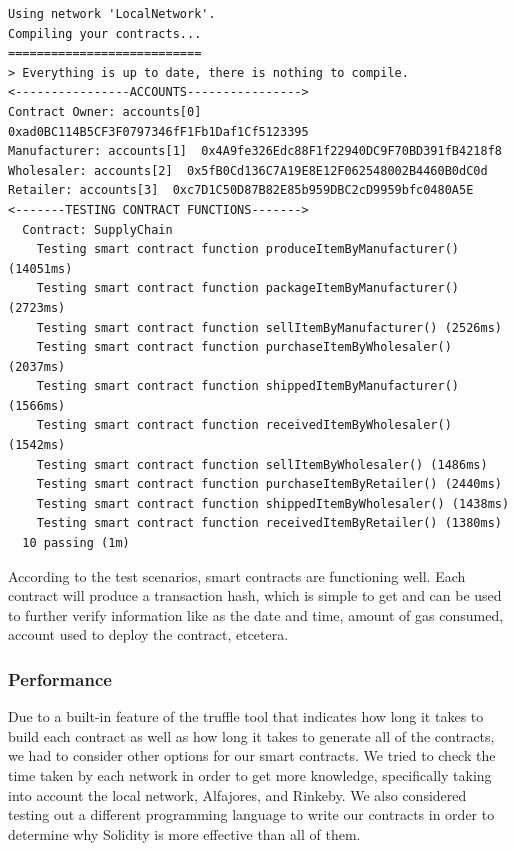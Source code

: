 \begin{lstlisting}[numbers=none, basicstyle=\ttfamily\tiny]
Using network 'LocalNetwork'.
Compiling your contracts...
===========================
> Everything is up to date, there is nothing to compile.
<----------------ACCOUNTS---------------->
Contract Owner: accounts[0]  0xad0BC114B5CF3F0797346fF1Fb1Daf1Cf5123395
Manufacturer: accounts[1]  0x4A9fe326Edc88F1f22940DC9F70BD391fB4218f8
Wholesaler: accounts[2]  0x5fB0Cd136C7A19E8E12F062548002B4460B0dC0d
Retailer: accounts[3]  0xc7D1C50D87B82E85b959DBC2cD9959bfc0480A5E
<-------TESTING CONTRACT FUNCTIONS------->
  Contract: SupplyChain
    Testing smart contract function produceItemByManufacturer() (14051ms)
    Testing smart contract function packageItemByManufacturer() (2723ms)
    Testing smart contract function sellItemByManufacturer() (2526ms)
    Testing smart contract function purchaseItemByWholesaler() (2037ms)
    Testing smart contract function shippedItemByManufacturer() (1566ms)
    Testing smart contract function receivedItemByWholesaler() (1542ms)
    Testing smart contract function sellItemByWholesaler() (1486ms)
    Testing smart contract function purchaseItemByRetailer() (2440ms)
    Testing smart contract function shippedItemByWholesaler() (1438ms)
    Testing smart contract function receivedItemByRetailer() (1380ms)
  10 passing (1m)
\end{lstlisting}

\vspace{.5cm}

According to the test scenarios, smart contracts are functioning well. Each contract will produce a transaction hash, which is simple to get and can be used to further verify information like as the date and time, amount of gas consumed, account used to deploy the contract, etcetera.

\subsubsection{Performance}

Due to a built-in feature of the truffle tool that indicates how long it takes to build each contract as well as how long it takes to generate all of the contracts, we had to consider other options for our smart contracts. We tried to check the time taken by each network in order to get more knowledge, specifically taking into account the local network, Alfajores, and Rinkeby. We also considered testing out a different programming language to write our contracts in order to determine why Solidity is more effective than all of them.

